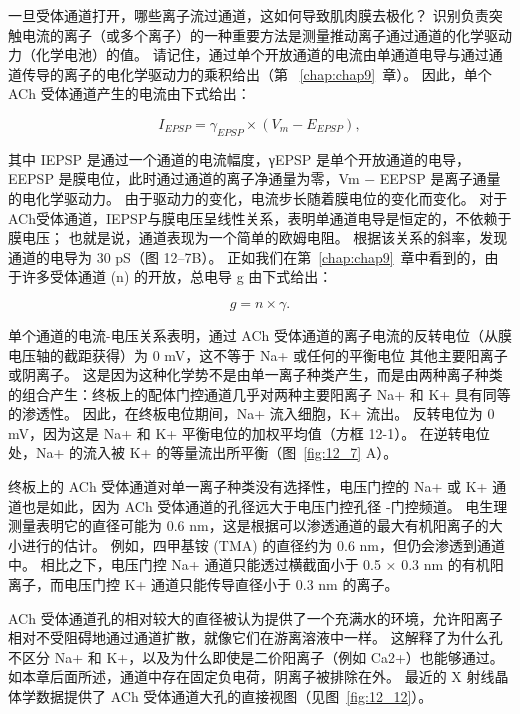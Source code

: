 一旦受体通道打开，哪些离子流过通道，这如何导致肌肉膜去极化？
识别负责突触电流的离子（或多个离子）的一种重要方法是测量推动离子通过通道的化学驱动力（化学电池）的值。
请记住，通过单个开放通道的电流由单通道电导与通过通道传导的离子的电化学驱动力的乘积给出（第 ~\ref{chap:chap9}~章）。 
因此，单个 ACh 受体通道产生的电流由下式给出：


\begin{equation}
	I_{EPSP} = \gamma_{EPSP}\times (V_m - E_{EPSP}),
\end{equation}


其中 IEPSP 是通过一个通道的电流幅度，γEPSP 是单个开放通道的电导，EEPSP 是膜电位，此时通过通道的离子净通量为零，Vm − EEPSP 是离子通量的电化学驱动力。
由于驱动力的变化，电流步长随着膜电位的变化而变化。 
对于ACh受体通道，IEPSP与膜电压呈线性关系，表明单通道电导是恒定的，不依赖于膜电压；
也就是说，通道表现为一个简单的欧姆电阻。
根据该关系的斜率，发现通道的电导为 30 pS（图 12–7B）。
正如我们在第~\ref{chap:chap9}~章中看到的，由于许多受体通道 (n) 的开放，总电导 g 由下式给出：


\begin{equation}
	g = n \times \gamma.
\end{equation}


单个通道的电流-电压关系表明，通过 ACh 受体通道的离子电流的反转电位（从膜电压轴的截距获得）为 0 mV，这不等于 Na+ 或任何的平衡电位 其他主要阳离子或阴离子。
这是因为这种化学势不是由单一离子种类产生，而是由两种离子种类的组合产生：终板上的配体门控通道几乎对两种主要阳离子 Na+ 和 K+ 具有同等的渗透性。
因此，在终板电位期间，Na+ 流入细胞，K+ 流出。
反转电位为 0 mV，因为这是 Na+ 和 K+ 平衡电位的加权平均值（方框 12-1）。
在逆转电位处，Na+ 的流入被 K+ 的等量流出所平衡（图~\ref{fig:12_7} A）。


终板上的 ACh 受体通道对单一离子种类没有选择性，电压门控的 Na+ 或 K+ 通道也是如此，因为 ACh 受体通道的孔径远大于电压门控孔径 -门控频道。
电生理测量表明它的直径可能为 0.6 nm，这是根据可以渗透通道的最大有机阳离子的大小进行的估计。
例如，四甲基铵 (TMA) 的直径约为 0.6 nm，但仍会渗透到通道中。
相比之下，电压门控 Na+ 通道只能透过横截面小于 0.5 × 0.3 nm 的有机阳离子，而电压门控 K+ 通道只能传导直径小于 0.3 nm 的离子。


ACh 受体通道孔的相对较大的直径被认为提供了一个充满水的环境，允许阳离子相对不受阻碍地通过通道扩散，就像它们在游离溶液中一样。
这解释了为什么孔不区分 Na+ 和 K+，以及为什么即使是二价阳离子（例如 Ca2+）也能够通过。
如本章后面所述，通道中存在固定负电荷，阴离子被排除在外。
最近的 X 射线晶体学数据提供了 ACh 受体通道大孔的直接视图（见图~\ref{fig:12_12}）。



